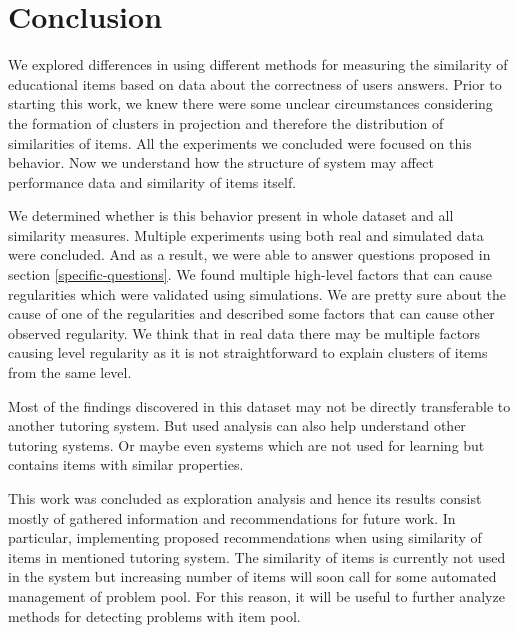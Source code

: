 \documentclass[
  digital, %
  table,   %
  nolof,     %
  nolot,     %
  nocover,
  color,
  final, %
]{fithesis3}
\begin{document}

\chapter{Conclusion}


We explored differences in using different methods for measuring the similarity of educational items based on data about the correctness of users answers. Prior to starting this work, we knew there were some unclear circumstances considering the formation of clusters in projection and therefore the distribution of similarities of items. All the experiments we concluded were focused on this behavior. Now we understand how the structure of system may affect performance data and similarity of items itself.

We determined whether is this behavior present in whole dataset and all similarity measures. Multiple experiments using both real and simulated data were concluded. And as a result, we were able to answer questions proposed in section \ref{specific-questions}. We found multiple high-level factors that can cause regularities which were validated using simulations. We are pretty sure about the cause of one of the regularities and described some factors that can cause other observed regularity. We think that in real data there may be multiple factors causing level regularity as it is not straightforward to explain clusters of items from the same level.

Most of the findings discovered in this dataset may not be directly transferable to another tutoring system. But used analysis can also help understand other tutoring systems. Or maybe even systems which are not used for learning but contains items with similar properties.


This work was concluded as exploration analysis and hence its results consist mostly of gathered information and recommendations for future work. In particular, implementing proposed recommendations when using similarity of items in mentioned tutoring system. The similarity of items is currently not used in the system \umimeCesky{} but increasing number of items will soon call for some automated management of problem pool. For this reason, it will be useful to further analyze methods for detecting problems with item pool.
\end{document}
